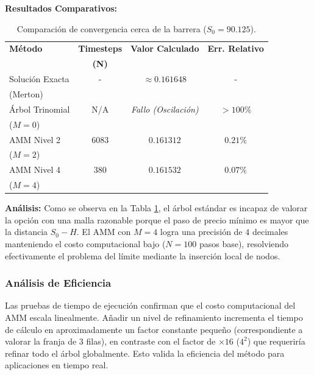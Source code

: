 \textbf{Resultados Comparativos:}

\begin{table}[h]
\centering
\caption{Comparación de convergencia cerca de la barrera ($S_0=90.125$).}
\label{tab:amm_results}
  \begin{tabular}{|l|c|c|c|}
    \hline
    \textbf{Método} & \textbf{Timesteps} & \textbf{Valor Calculado} & \textbf{Err. Relativo} \\
    & \textbf{(N)} & & \\
    \hline Solución Exacta & - & \textbf{$\approx 0.161648$} & - \\
    (Merton) & & & \\
    \hline Árbol Trinomial & N/A & \textit{Fallo (Oscilación)} & $>100\%$ \\
    ($M=0$) & & & \\
    \hline AMM Nivel 2 & $6083$ & $0.161312$ & $0.21\%$ \\
    ($M=2$) & & & \\
    \hline AMM Nivel 4 & $380$ & \textbf{$0.161532$} & $0.07\%$ \\
    ($M=4$) & & & \\
    \hline
  \end{tabular}
\end{table}

\textbf{Análisis:} Como se observa en la Tabla \ref{tab:amm_results}, el árbol estándar es incapaz de valorar la opción con una malla razonable porque el paso de precio mínimo es mayor que la distancia $S_0-H$. El AMM con $M=4$ logra una precisión de $4$ decimales manteniendo el costo computacional bajo ($N=100$ pasos base), resolviendo efectivamente el problema del límite mediante la inserción local de nodos.

\subsubsection{Análisis de Eficiencia} 

Las pruebas de tiempo de ejecución confirman que el costo computacional del AMM escala linealmente. Añadir un nivel de refinamiento incrementa el tiempo de cálculo en aproximadamente un factor constante pequeño (correspondiente a valorar la franja de 3 filas), en contraste con el factor de $\times16$ ($4^2$) que requeriría refinar todo el árbol globalmente. Esto valida la eficiencia del método para aplicaciones en tiempo real.
